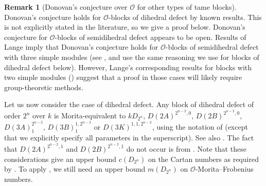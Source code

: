 \documentclass{amsart}
\theoremstyle{plain}\newtheorem{Theorem}{Theorem}[section]
\theoremstyle{plain}\newtheorem{Conjecture}[Theorem]{Conjecture}
\theoremstyle{plain}\newtheorem{Corollary}[Theorem]{Corollary}
\theoremstyle{plain}\newtheorem{Lemma}[Theorem]{Lemma}
\theoremstyle{plain}\newtheorem{Proposition}[Theorem]{Proposition}
\theoremstyle{definition}\newtheorem{Definition}[Theorem]{Definition}
\theoremstyle{definition}\newtheorem{Example}[Theorem]{Example}
\theoremstyle{definition}\newtheorem{Examples}[Theorem]{Examples}
\theoremstyle{definition}\newtheorem{Exercise}[Theorem]{Exercise}
\theoremstyle{definition}\newtheorem{Notation}[Theorem]{Notation}
\theoremstyle{definition}\newtheorem{Remark}[Theorem]{Remark}
\theoremstyle{definition}\newtheorem{Remarks}[Theorem]{Remarks}
\def\CO{{\mathcal{O}}}    \def\OPE{{\mathcal{O}(P\rtimes E)}}
\numberwithin{equation}{section}
\begin{document}
\begin{Remark}[Donovan's conjecture over $\CO$ for other types of tame blocks]
Donovan's conjecture holds for $\CO$-blocks of dihedral defect by known results. This is not explicitly stated in the literature, so we give a proof below. Donovan's conjecture for $\CO$-blocks of semidihedral defect appears to be open. Results of Lange \cite{LangeDiss} imply that Donovan's conjecture holds for $\CO$-blocks of semidihedral defect with three simple modules (see \cite[Thm.~3.2.21]{LangeDiss}, and use the same reasoning we use for blocks of dihedral defect below). However, Lange's corresponding results for blocks with two simple modules (\cite[Thms.~3.2.11,~3.2.14]{LangeDiss}) suggest that a proof in those cases will likely require group-theoretic methods. 

Let us now consider the case of dihedral defect.
Any block of dihedral defect of order $2^n$ over $k$ is Morita-equivalent to $kD_{2^n}$, $D(2A)^{2^{n-2},0}$, $D(2B)^{2^{n-2},0}$, $D(3A)_1^{2^{n-2}}$, $D(3B)_1^{1,2^{n-2}}$ or $D(3K)^{1,1,2^{n-2}}$, using the notation of \cite{Erdmann88} (except that we explicitly specify all parameters in the superscript). See also \cite[Thm. on~p.~180]{Holm97}. The fact that $D(2A)^{2^{n-2},1}$ and $D(2B)^{2^{n-2},1}$ do not occur is from \cite[Cor.~6.9]{Eisele12}. Note that these considerations give an upper bound $c(D_{2^n})$ on the Cartan numbers as required by . To apply , we still need an upper bound $m(D_{2^n})$ on $\CO$-Morita--Frobenius numbers.


\end{Remark}
\end{document}

